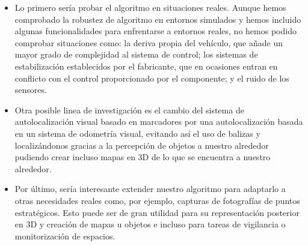 \begin{itemize}
	\item Lo primero sería probar el algoritmo en situaciones reales. Aunque hemos comprobado la robustez de algoritmo en entornos simulados y hemos incluido algunas funcionalidades para enfrentarse a entornos reales, no hemos podido comprobar situaciones como: la deriva propia del vehículo, que añade un mayor grado de complejidad al sistema de control; los sistemas de estabilización establecidos por el fabricante, que en ocasiones entran en conflicto con el control proporcionado por el componente; y el ruido de los sensores.
	\item Otra posible linea de investigación es el cambio del sistema de autolocalización visual basado en marcadores por una autolocalización basada en un sistema de odometría visual, evitando así el uso de balizas y localizándonos gracias a la percepción de objetos a nuestro alrededor pudiendo crear incluso mapas en 3D de lo que se encuentra a nuestro alrededor.
	\item Por último, sería interesante extender nuestro algoritmo para adaptarlo a otras necesidades reales como, por ejemplo, capturas de fotografías de puntos estratégicos. Esto puede ser de gran utilidad para su representación posterior en 3D y creación de mapas u objetos e incluso para tareas de vigilancia o monitorización de espacios.
\end{itemize}